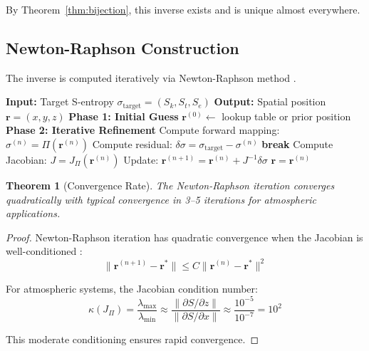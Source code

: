 \documentclass[twocolumn,10pt,a4paper]{article}
\newtheorem{theorem}{Theorem}[section]
\theoremstyle{definition}
\theoremstyle{remark}
\begin{document}
By Theorem~\ref{thm:bijection}, this inverse exists and is unique almost everywhere.

\subsection{Newton-Raphson Construction}

The inverse is computed iteratively via Newton-Raphson method \cite{press2007numerical}.

\begin{algorithm}[H]
\caption{Inverse S-Entropy Mapping via Newton-Raphson}
\label{alg:inverse}
\begin{algorithmic}[1]
\STATE \textbf{Input:} Target S-entropy $\sigma_{\text{target}} = (S_k, S_t, S_e)$
\STATE \textbf{Output:} Spatial position $\mathbf{r} = (x, y, z)$
\STATE
\STATE \textbf{Phase 1: Initial Guess}
\STATE $\mathbf{r}^{(0)} \gets$ lookup table or prior position
\STATE
\STATE \textbf{Phase 2: Iterative Refinement}
    \STATE Compute forward mapping: $\sigma^{(n)} = \Pi(\mathbf{r}^{(n)})$
    \STATE Compute residual: $\delta\sigma = \sigma_{\text{target}} - \sigma^{(n)}$
        \STATE \textbf{break}
    \ENDIF
    \STATE Compute Jacobian: $J = J_{\Pi}(\mathbf{r}^{(n)})$
    \STATE Update: $\mathbf{r}^{(n+1)} = \mathbf{r}^{(n)} + J^{-1} \delta\sigma$
\ENDFOR
\STATE
\RETURN $\mathbf{r} = \mathbf{r}^{(n)}$
\end{algorithmic}
\end{algorithm}

\begin{theorem}[Convergence Rate]
\label{thm:convergence}
The Newton-Raphson iteration converges quadratically with typical convergence in 3--5 iterations for atmospheric applications.
\end{theorem}

\begin{proof}
Newton-Raphson iteration has quadratic convergence when the Jacobian is well-conditioned \cite{nocedal2006numerical}:
\begin{equation}
    \|\mathbf{r}^{(n+1)} - \mathbf{r}^*\| \leq C \|\mathbf{r}^{(n)} - \mathbf{r}^*\|^2
\end{equation}

For atmospheric systems, the Jacobian condition number:
\begin{equation}
    \kappa(J_{\Pi}) = \frac{\lambda_{\max}}{\lambda_{\min}} \approx \frac{\|\partial S/\partial z\|}{\|\partial S/\partial x\|} \approx \frac{10^{-5}}{10^{-7}} = 10^2
\end{equation}

This moderate conditioning ensures rapid convergence.
\end{proof}
\end{document}
